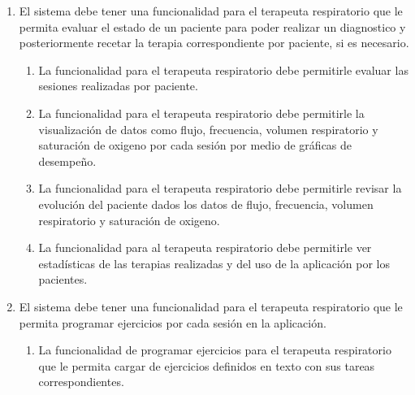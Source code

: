 \documentclass[12pt]{article}
\begin{document}
\begin{enumerate}[start=1,label={\bfseries RF0\arabic*.}]

    \item El sistema debe tener una funcionalidad para el terapeuta respiratorio que le permita evaluar el estado de un paciente para poder realizar un diagnostico y posteriormente recetar la terapia correspondiente por paciente, si es necesario.
        \label{RF01}
            \begin{enumerate}[label*=\arabic*.]
                \item La funcionalidad para el terapeuta respiratorio debe permitirle evaluar las sesiones realizadas por paciente.
                
                \item La funcionalidad para el terapeuta respiratorio debe permitirle la visualización de datos como flujo, frecuencia, volumen respiratorio y saturación de oxigeno por cada sesión por medio de gráficas de desempeño.
                
                \item La funcionalidad para el terapeuta respiratorio debe permitirle revisar la evolución del paciente dados los datos de flujo, frecuencia, volumen respiratorio y saturación de oxigeno.  %
                
                \item La funcionalidad para al terapeuta respiratorio debe permitirle ver estadísticas de las terapias realizadas y del uso de la aplicación por los pacientes. %
                
              
            \end{enumerate}

    \item El sistema debe tener una funcionalidad para el terapeuta respiratorio que le permita programar  ejercicios por cada sesión en la aplicación.
        
        \label{RF02}
            \begin{enumerate}[label*=\arabic*.]
            
                \item La funcionalidad de programar ejercicios para el terapeuta respiratorio que le permita cargar de ejercicios definidos en texto con sus tareas correspondientes. %
                 

\end{enumerate}
\end{enumerate}
\end{document}

